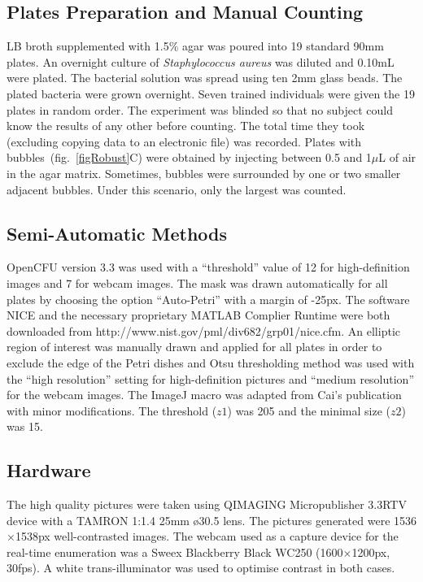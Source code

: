 \documentclass[10pt]{article}
\newcommand{\N}{Seven}
\newcommand{\sa}{\emph{Staphylococcus aureus}}
\begin{document}
\subsection*{Plates Preparation and Manual Counting}
LB broth supplemented with 1.5\% agar was poured into 19 standard 90mm plates.
An overnight culture of \sa{} was diluted and 0.10mL were plated. The bacterial
solution was spread using ten 2mm glass beads. The plated bacteria were grown
overnight.
\N{} trained individuals were given the 19 plates in random order. The
experiment was blinded so that no subject could know the results of any other before counting.
The total time they took (excluding copying data to an electronic file) was
recorded.
Plates with bubbles~(fig.~\ref{figRobust}C) were obtained by injecting between 0.5 and 1$\mu{}$L of air in the agar matrix.
Sometimes, bubbles were surrounded by one or two smaller adjacent bubbles. Under this scenario, only the largest was counted.



\subsection*{Semi-Automatic Methods} 

OpenCFU version 3.3 was used with a ``threshold'' value of 12 for high-definition images and 7 for webcam images.
The mask was drawn automatically for all plates by choosing the option ``Auto-Petri'' with a margin of -25px. 
The software NICE and the necessary proprietary MATLAB Complier Runtime were both downloaded from
http://www.nist.gov/pml/div682/grp01/nice.cfm.
An elliptic region of interest was manually drawn and applied for all plates
in order to exclude the edge of the Petri dishes and Otsu thresholding method
was used with the ``high resolution'' setting for high-definition pictures and ``medium resolution'' for the webcam images.
The ImageJ macro was adapted from Cai's publication\cite{cai_optimized_2011} with minor modifications.
The threshold ($z1$) was 205 and the minimal size ($z2$) was 15.


\subsection*{Hardware} 
The high quality pictures were taken using QIMAGING Micropublisher 3.3RTV
device with a TAMRON 1:1.4 25mm \o 30.5 lens. The pictures generated were
1536$\times{}$1538px well-contrasted images.
The webcam used as a capture device for the real-time enumeration was a Sweex
Blackberry Black WC250 (1600$\times{}$1200px, 30fps).
A white trans-illuminator was used to optimise contrast in both cases.
\end{document}
